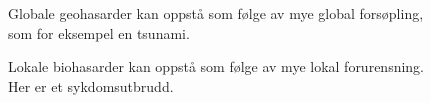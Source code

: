 \begin{figure}
\centering
\setlength\fboxsep{0.2pt}
\setlength\fboxrule{0.7pt}
\caption{Globale geohasarder kan oppstå som følge av mye global forsøpling, som for eksempel en tsunami.}
\label{fig:Tsunami}
\end{figure}

\begin{figure} 
\centering
\setlength\fboxsep{0.2pt}
\setlength\fboxrule{0.7pt}
\caption{Lokale biohasarder kan oppstå som følge av mye lokal forurensning. Her er et sykdomsutbrudd.}
\label{fig:Kolera}
\end{figure}

